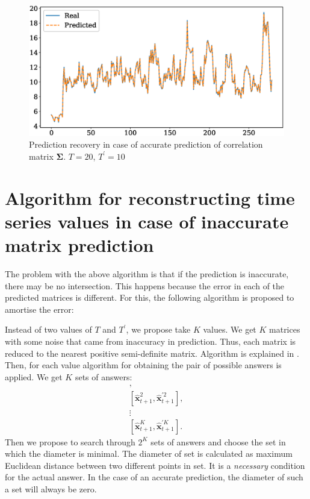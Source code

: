 \documentclass{article}
\begin{document}
{\begin{figure}[H]
	\centering
	\includegraphics[width=\textwidth]{IdealRecovery.eps}
	\caption{Prediction recovery in case of accurate prediction of correlation matrix $\mathbf{\Sigma}$. $T=20$, $T^\prime=10$}
	\label{fig:fig3}
\end{figure}

\section{Algorithm for reconstructing time series values in case of inaccurate matrix prediction}

The problem with the above algorithm is that if the prediction is inaccurate, there may be no intersection. This happens because the error in each of the predicted matrices is different. For this, the following algorithm is proposed to amortise the error:

Instead of two values of $T$ and $T^\prime$, we propose take $K$ values. We get $K$ matrices with some noise that came from inaccuracy in prediction. Thus, each matrix is reduced to the nearest positive semi-definite matrix. Algorithm is explained in \cite{HIGHAM1988103}.
Then, for each value algorithm for obtaining the pair of possible answers is applied.
We get $K$ sets of answers:
\begin{gather*}
	[\hat{\mathbf{x}}_{t+1}^1, \hat{\mathbf{x}}^{\prime 1}_{t+1}],\\
	[\hat{\mathbf{x}}_{t+1}^2, \hat{\mathbf{x}}^{\prime 2}_{t+1}],\\
	\vdots \\
	[\hat{\mathbf{x}}_{t+1}^K, \hat{\mathbf{x}}^{\prime K}_{t+1}].
\end{gather*}
Then we propose to search through $2^K$ sets of answers and choose the set in which the diameter is minimal. The diameter of set is calculated as maximum Euclidean distance between two different points in set. It is a \textit{necessary} condition for the actual answer. In the case of an accurate prediction, the diameter of such a set will always be zero.

}
\end{document}
